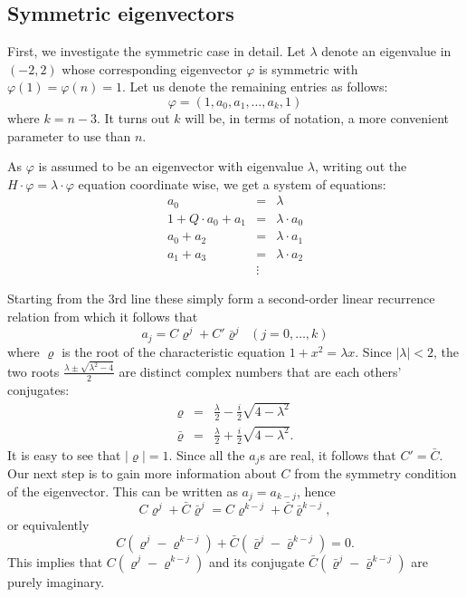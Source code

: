 \documentclass{article}
\theoremstyle{definition}
\numberwithin{equation}{section}
\numberwithin{theorem}{section}
\newcommand{\ro}{\varrho}
\newcommand{\brho}{\bar{\varrho}}
\begin{document}
\subsection{Symmetric eigenvectors}

First, we investigate the symmetric case in detail.  
Let \( \lambda\) denote an eigenvalue in $(-2,2)$ whose corresponding eigenvector \( \varphi \) is symmetric with $\varphi(1)=\varphi(n)=1$. Let us denote the remaining entries as follows:
\[
\varphi = (1, a_0, a_1, \dots, a_k, 1)
\] where $k=n-3$. It turns out $k$ will be, in terms of notation, a more convenient parameter to use than $n$.

As $\varphi$ is assumed to be an eigenvector with eigenvalue $\lambda$, writing out the \( H \cdot \varphi = \lambda \cdot \varphi\) equation coordinate wise, we get a system of equations:
\begin{eqnarray}
\label{eq:a0} a_0 &=& \lambda\\
\label{eq:a0Q} 1+Q\cdot a_0 + a_1 &=& \lambda \cdot a_0\\
a_0 + a_2 &=& \lambda \cdot a_1 \\
a_1 + a_3 &=& \lambda \cdot a_2 \\
&\vdots&
\end{eqnarray}

Starting from the 3rd line these simply form a second-order linear recurrence relation from which it follows that 
\[
 a_j = C\ro^j + C' \brho^j \;\;(j = 0,\dots,k)
\]
where $\ro$ is the root of the characteristic equation $1+x^2 = \lambda x$. Since $|\lambda| < 2$, the two roots $\frac{\lambda \pm \sqrt{\lambda^2 - 4}}{2}$ are distinct complex numbers that are each others' conjugates:
\begin{eqnarray*}
    \ro &=& \frac{\lambda}{2} - \frac{i}{2}\sqrt{4 - \lambda^2}\\
    \brho &=& \frac{\lambda}{2} + \frac{i}{2}\sqrt{4 - \lambda^2}.
\end{eqnarray*} 
It is easy to see that $|\ro| = 1$. Since all the $a_j$s are real, it follows that $C'= \bar C$. Our next step is to gain more information about $C$ from the symmetry condition of the eigenvector. This can be written as $a_j = a_{k-j}$, hence 
\[
C \ro^j + \bar{C} \brho^j = C \ro^{k-j} + \bar{C} \brho^{k-j},
\]
or equivalently
\[
C (\ro^j - \ro^{k-j}) + \bar{C} (\brho^j - \brho^{k-j}) = 0.
\]
This implies that \( C (\ro^j - \ro^{k-j}) \) and its conjugate \( \bar{C} (\brho^j - \brho^{k-j}) \) are purely imaginary.
\end{document}
